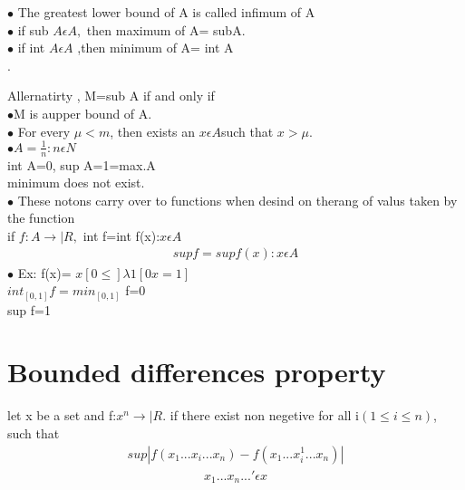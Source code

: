 \documentclass[journal,12pt,twocolumn]{IEEEtran}
\begin{document}
$\bullet$ The greatest lower bound of A is called infimum of A \\

$\bullet$ if sub $A \epsilon A,$ then maximum of A= subA.\\

$\bullet$ if int $A \epsilon A$ ,then minimum of A= int A\\.

Allernatirty , M=sub A if and only if \\

$\bullet$M is aupper bound of  A.\\

$\bullet$ For every $\mu <m $, then exists an $x\epsilon A$such that $x > \mu$.\\

$\bullet A={\frac{1}{n}:n \epsilon N}$\\

int A=0, sup A=1=max.A\\

minimum does not exist.\\

$\bullet$ These notons carry over to functions when desind on therang of valus taken by the function\\

if $f:A \rightarrow |R,$ int f=int {f(x):$x\epsilon A$}\\
\begin{align}
sup f =sup{f(x):x \epsilon A}
\end{align}
$\bullet$ Ex: f(x)= $x [0\leqslant] \lambda 1 [0 x=1]$\\

$int_[0,1] f=min_[0,1]$ f=0\\

sup f=1\\

\section{Bounded differences property}
let x be a set and f:$x^n\rightarrow |R.$ if there exist non negetive  for all i$(1\leqslant i \leqslant n)$, such that \\
\begin{align}
sup| f(x_1...x_i...x_n)-f(x_1...x_i^1...x_n)|
\end{align}
\begin{align}
x_1...x_n...' \epsilon x
\end{align}
\end{document}
